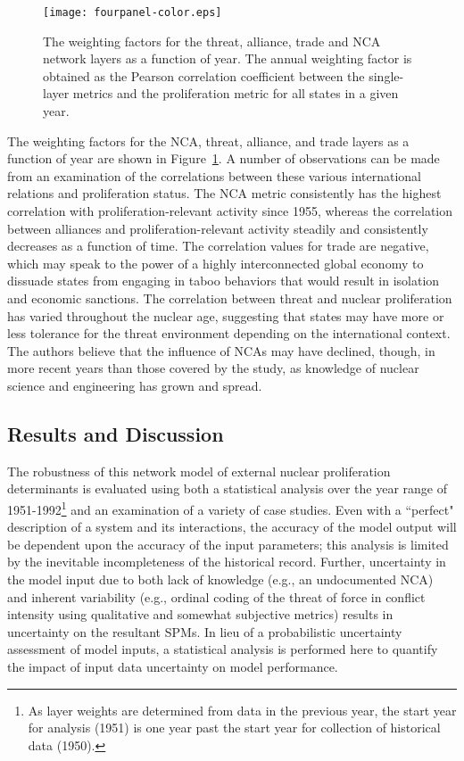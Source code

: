 \documentclass{article} %
\begin{document}
{\begin{figure}
  \centering
  \texttt{[image: fourpanel-color.eps]}
  \caption{The weighting factors for the threat, alliance, trade and NCA network layers as a function of year. The annual weighting factor is obtained as the Pearson correlation coefficient between the single-layer metrics and the proliferation metric for all states in a given year.}
  \label{fig:alliance_weights}
\end{figure}

The weighting factors for the NCA, threat, alliance, and trade layers as a function of year are shown in Figure~\ref{fig:alliance_weights}. A number of observations can be made from an examination of the correlations between these various international relations and proliferation status. The NCA metric consistently has the highest correlation with proliferation-relevant activity since 1955, whereas the correlation between alliances and proliferation-relevant activity steadily and consistently decreases as a function of time. The correlation values for trade are negative, which may speak to the power of a highly interconnected global economy to dissuade states from engaging in taboo behaviors that would result in isolation and economic sanctions. The correlation between threat and nuclear proliferation has varied throughout the nuclear age, suggesting that states may have more or less tolerance for the threat environment depending on the international context.  The authors believe that the influence of NCAs may have declined, though, in more recent years than those covered by the study, as knowledge of nuclear science and engineering has grown and spread.

\subsection{Results and Discussion}

The robustness of this network model of external nuclear proliferation determinants is evaluated using both a statistical analysis over the year range of 1951-1992\footnote{As layer weights are determined from data in the previous year, the start year for analysis (1951) is one year past the start year for collection of historical data (1950).} and an examination of a variety of case studies. Even with a ``perfect" description of a system and its interactions, the accuracy of the model output will be dependent upon the accuracy of the input parameters; this analysis is limited by the inevitable incompleteness of the historical record. Further, uncertainty in the model input due to both lack of knowledge (e.g., an undocumented NCA) and inherent variability (e.g., ordinal coding of the threat of force in conflict intensity using qualitative and somewhat subjective metrics) results in uncertainty on the resultant SPMs. In lieu of a probabilistic uncertainty assessment of model inputs, a statistical analysis is performed here to quantify the impact of input data uncertainty on model performance.  


}
\end{document}
